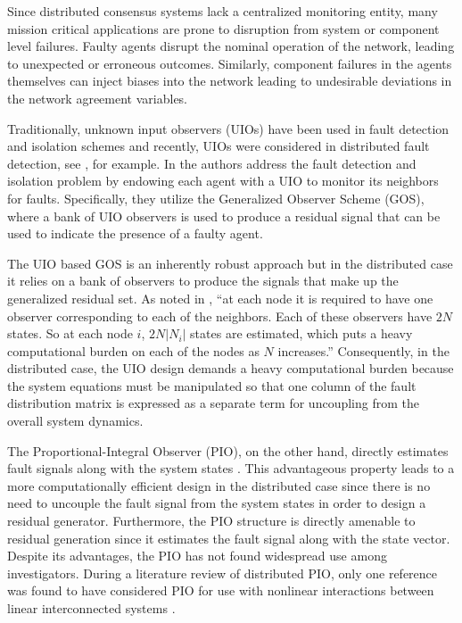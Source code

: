 \documentclass[letterpaper, 11 pt, conference]{ieeeconf}  %
\begin{document}
\medskip

Since distributed consensus systems lack a centralized monitoring entity, many mission critical applications are prone to disruption from system or component level failures. Faulty agents disrupt the nominal operation of the network, leading to unexpected or erroneous outcomes.  Similarly, component failures in the agents themselves can inject biases into the network leading to undesirable deviations in the network agreement variables. 

\medskip

Traditionally, unknown input observers (UIOs) have been used in fault detection and isolation schemes \cite{chen_robust_1999} and recently, UIOs were considered in distributed fault detection, see \cite{shames_distributed_2011,teixeira_distributed_2014}, for example. In \cite{shames_distributed_2011,teixeira_distributed_2014} the authors address the fault detection and isolation problem by endowing each agent with a UIO to monitor its neighbors for faults. Specifically, they utilize the Generalized Observer Scheme (GOS), where a bank of UIO observers is used to produce a residual signal that can be used to indicate the presence of a faulty agent.  

\medskip

The UIO based GOS is an inherently robust approach but in the distributed case it relies on a bank of observers to produce the signals that make up the generalized residual set. As noted in \cite{shames_distributed_2011}, ``at each node it is required to have one observer corresponding to each of the neighbors. Each of these observers have $2N$ states. So at each node $i$, $2N|N_i|$ states are estimated, which puts a heavy computational burden on each of the nodes as $N$ increases.'' Consequently, in the distributed case, the UIO design demands a heavy computational burden because the system equations must be manipulated so that one column of the fault distribution matrix is expressed as a separate term for uncoupling from the overall system dynamics.   

\medskip

The Proportional-Integral Observer (PIO), on the other hand, directly estimates fault signals along with the system states \cite{oghbaee_complete_2018,shafai_proportional-integral_2015,b._shafai_s._beale_h.h._niemann_and_j._stoustrup_ltr_1996}. This advantageous property leads to a more computationally efficient design in the distributed case since there is no need to uncouple the fault signal from the system states in order to design a residual generator. Furthermore, the PIO structure is directly amenable to residual generation since it estimates the fault signal along with the state vector. Despite its advantages, the PIO has not found widespread use among investigators. During a literature review of distributed PIO, only one reference was found to have considered PIO for use with nonlinear interactions between linear interconnected systems \cite{ghadami_decentralized_2011}. 
\end{document}
